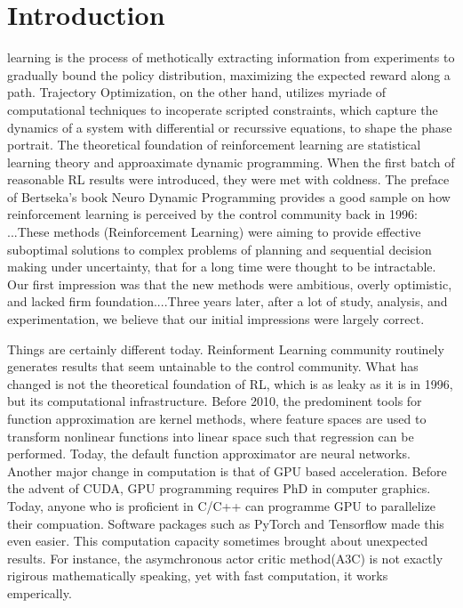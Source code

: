 \documentclass[journal]{IEEEtran}
\begin{document}
\section{Introduction}
 learning is the process of methotically extracting information from experiments to gradually bound the policy distribution, maximizing the expected reward along a path. Trajectory Optimization, on the other hand, utilizes myriade of computational techniques to incoperate scripted constraints, which capture the dynamics of a system with differential or recurssive equations, to shape the phase portrait. The theoretical foundation of reinforcement learning are statistical learning theory and approaximate dynamic programming. When the first batch of reasonable RL results were introduced, they were met with coldness. The preface of Bertseka's book Neuro Dynamic Programming provides a good sample on how reinforcement learning is perceived by the control community back in 1996: ...These methods (Reinforcement Learning) were aiming to provide effective suboptimal solutions to complex problems of planning and sequential decision making under uncertainty, that for a long time were thought to be intractable. Our first impression was that the new methods were ambitious, overly optimistic, and lacked firm foundation....Three years later, after a lot of study, analysis, and experimentation, we believe that our initial impressions were largely correct. \cite{Bertsekas1996NeuroDynamicP}

Things are certainly different today. Reinforment Learning community routinely generates results that seem untainable to the control community. What has changed is not the theoretical foundation of RL, which is as leaky as it is in 1996, but its computational infrastructure. Before 2010, the predominent tools for function approximation are kernel methods, where feature spaces are used to transform nonlinear functions into linear space such that regression can be performed. Today, the default function approximator are neural networks. Another major change in computation is that of GPU based acceleration. Before the advent of CUDA, GPU programming requires PhD in computer graphics. Today, anyone who is proficient in C/C++ can programme GPU to parallelize their compuation. Software packages such as PyTorch and Tensorflow made this even easier. This computation capacity sometimes brought about unexpected results. For instance, the asymchronous actor critic method(A3C) is not exactly rigirous mathematically speaking, yet with fast computation, it works emperically.
\end{document}
